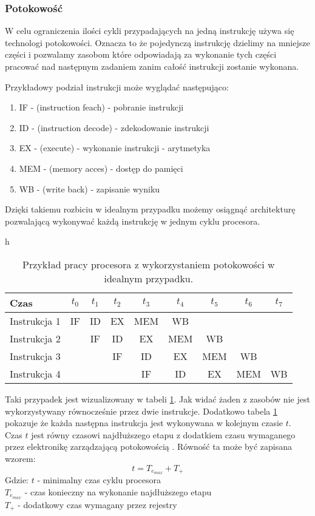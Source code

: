 \subsubsection{Potokowość}

W celu ograniczenia ilości cykli przypadających na jedną instrukcję używa się technologi potokowości. 
Oznacza to że pojedynczą instrukcję dzielimy na mniejsze części i pozwalamy zasobom które odpowiadają za wykonanie tych części pracować nad następnym zadaniem zanim całość instrukcji zostanie wykonana.

Przykładowy podział instrukcji może wyglądać następująco:
\begin{enumerate}
        \item IF - (instruction feach) - pobranie instrukcji
        \item ID - (instruction decode) -  zdekodowanie instrukcji
        \item EX - (execute) - wykonanie instrukcji - arytmetyka
        \item MEM - (memory acces) - dostęp do pamięci
        \item WB - (write back) - zapisanie wyniku
\end{enumerate}

Dzięki takiemu rozbiciu w idealnym przypadku możemy osiągnąć architekturę pozwalającą wykonywać każdą instrukcję w jednym cyklu procesora. 

\begin{table}{h}
        \centering
        \caption{Przykład pracy procesora z wykorzystaniem potokowości w idealnym przypadku.}
        \label{pipelining}
        \begin{tabular}{lcccccccc}
                Czas & $t_0$&$t_1$&$t_2$&$t_3$&$t_4$&$t_5$&$t_6$&$t_7$ \\ \hline
                Instrukcja 1 & IF & ID & EX & MEM & WB &    & \\
                Instrukcja 2 &    & IF & ID & EX & MEM & WB & \\
                Instrukcja 3 &    &    & IF & ID & EX & MEM & WB \\
                Instrukcja 4 &    &    &    & IF & ID & EX & MEM & WB
        \end{tabular}
\end{table}


Taki przypadek jest wizualizowany w tabeli \ref{pipelining}. Jak widać żaden z zasobów nie jest wykorzystywany równocześnie przez dwie instrukcje.
Dodatkowo tabela \ref{pipelining} pokazuje że każda następna instrukcja jest wykonywana w kolejnym czasie $t$. 
Czas $t$ jest równy czasowi najdłuższego etapu z dodatkiem czasu wymaganego przez elektronikę zarządzającą potokowością \cite{arch}.
Równość ta może być zapisana wzorem:
\begin{equation}
        t = T_{e_{max}} + T_{+}
\end{equation}
Gdzie:
        $t$ - minimalny czas cyklu procesora \\
        $T_{e_{max}}$ - czas konieczny na wykonanie najdłuższego etapu \\
        $T_{+}$ - dodatkowy czas wymagany przez rejestry \\


